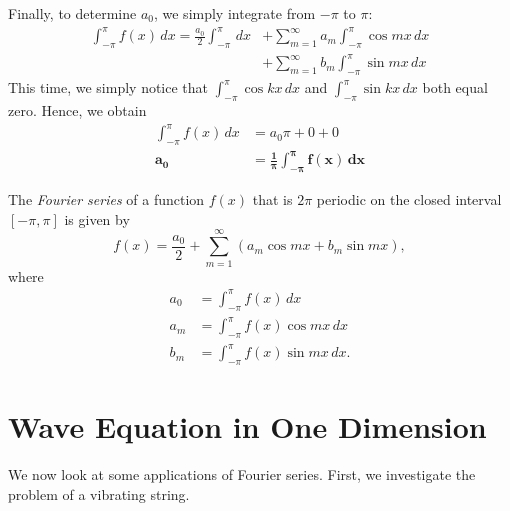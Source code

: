 \documentclass{amsart}
\begin{document}
  Finally, to determine $a_0$, we simply integrate from $-\pi$ to $\pi$:
  \begin{align*}
    \int_{-\pi}^{\pi} f(x)\, dx = \frac{a_0}{2} \int_{-\pi}^{\pi} \, dx &+ \sum_{m=1}^{\infty} a_m \int_{-\pi}^{\pi} \cos mx\, dx \\
                                &+ \sum_{m=1}^{\infty} b_m \int_{-\pi}^{\pi} \sin mx\, dx 
  \end{align*}
  This time, we simply notice that $\int_{-\pi}^{\pi} \cos kx\, dx $ and $\int_{-\pi}^{\pi} \sin kx\, dx$ both equal zero. Hence, we obtain 
  \begin{align*}
    \int_{-\pi}^{\pi} f(x) \, dx &= a_0 \pi + 0 + 0 \\
    \bm{a_0} &\bm{= \frac{1}{\pi} \int_{-\pi}^{\pi} f(x) \, dx} 
  \end{align*}
  \begin{definition}
    The \emph{Fourier series} of a function $f(x)$ that is $2\pi$ periodic on the closed interval  $[-\pi, \pi]$ is given by \[
      f(x) = \frac{a_0}{2} + \sum_{m=1}^{\infty} (a_m \cos mx + b_m \sin mx)
    ,\] where 
    \begin{align*}
      a_0 &= \int_{-\pi}^{\pi} f(x)\, dx \\
      a_m &= \int_{-\pi}^{\pi} f(x)\cos mx\, dx \\
      b_m &= \int_{-\pi}^{\pi} f(x)\sin mx\, dx.
    \end{align*}
  \end{definition}


  \section{Wave Equation in One Dimension}
  
  We now look at some applications of Fourier series. First, we investigate the problem of a vibrating string.
\end{document}
